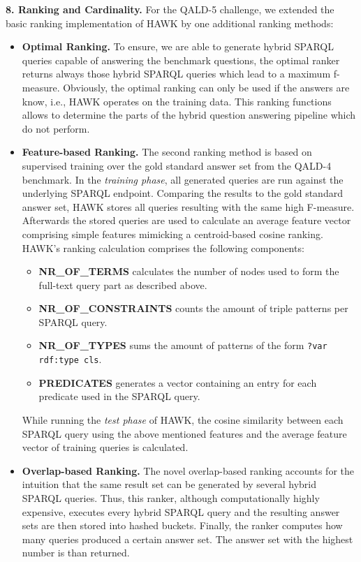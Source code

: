 \documentclass{llncs}
\begin{document}
\textbf{8. Ranking and Cardinality.}
For the QALD-5 challenge, we extended the basic ranking implementation of HAWK by one additional ranking methods:
\begin{itemize}
\item \textbf{Optimal Ranking.} To ensure, we are able to generate hybrid SPARQL queries capable of answering the benchmark questions, the optimal ranker returns always those hybrid SPARQL queries which lead to a maximum f-measure.  
    Obviously, the optimal ranking can only be used if the answers are know, i.e., HAWK operates on the training data.
    This ranking functions allows to determine the parts of the hybrid question answering pipeline which do not perform. 
\item \textbf{Feature-based Ranking.} The second ranking method is based on supervised training over the gold standard answer set from the QALD-4 benchmark.
    In the \emph{training phase}, all generated queries are run against the underlying SPARQL endpoint. 
    Comparing the results to the gold standard answer set, HAWK stores all queries resulting with the same high F-measure.
    Afterwards the stored queries are used to calculate an average feature vector comprising simple features mimicking a centroid-based cosine ranking.
    HAWK's ranking calculation comprises the following components:
    \begin{itemize}
    \item \textbf{NR\_OF\_TERMS} calculates the number of nodes used to form the full-text query part as described above.
    \item \textbf{NR\_OF\_CONSTRAINTS} counts the amount of triple patterns per SPARQL query.
    \item \textbf{NR\_OF\_TYPES} sums the amount of patterns of the form \texttt{?var rdf:type cls}.
    \item \textbf{PREDICATES} generates a vector containing an entry for each predicate used in the SPARQL query.
    \end{itemize}
    While running the \emph{test phase} of HAWK, the cosine similarity between each SPARQL query using the above mentioned features and the average feature vector of training queries is calculated.
\item \textbf{Overlap-based Ranking.} The novel overlap-based ranking accounts for the intuition that the same result set can be generated by several hybrid SPARQL queries. 
    Thus, this ranker, although computationally highly expensive, executes every hybrid SPARQL query and the resulting answer sets are then stored into hashed buckets. 
    Finally, the ranker computes how many queries produced a certain answer set. 
    The answer set with the highest number is than returned.
\end{itemize}
\end{document}
